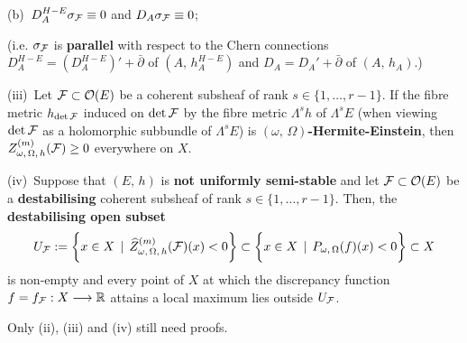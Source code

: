 \documentclass[12pt]{article}
\begin{document}
\begin{Cor}
\vspace{1ex}  

\hspace{2ex} (b)\, $D^{H-E}_A\sigma_{{\cal F}}\equiv 0$ \hspace{3ex} and \hspace{3ex} $D_A\sigma_{{\cal F}}\equiv 0$;

\vspace{1ex}

\noindent (i.e. $\sigma_{{\cal F}}$ is {\bf parallel} with respect to the Chern connections $D^{H-E}_A = (D^{H-E}_A)' + \bar\partial$ of $(A,\,h_A^{H-E})$ and $D_A = D_A' + \bar\partial$ of $(A,\,h_A)$.)

\vspace{1ex}  

(iii)\, Let ${\cal F}\subset{\cal O}(E)$ be a coherent subsheaf of rank $s\in\{1,\dots , r-1\}$. If the fibre metric $h_{\det{\cal F}}$ induced on $\det{\cal F}$ by the fibre metric $\Lambda^sh$ of $\Lambda^sE$ (when viewing $\det{\cal F}$ as a holomorphic subbundle of $\Lambda^sE$) is {\bf $(\omega,\,\Omega)$-Hermite-Einstein}, then  $Z_{\omega,\,\Omega,\,h}^{(m)}({\cal F})\geq 0$ everywhere on $X$.

\vspace{1ex}  

(iv)\, Suppose that $(E,\,h)$ is {\bf not uniformly semi-stable} and let ${\cal F}\subset{\cal O}(E)$ be a {\bf destabilising} coherent subsheaf of rank $s\in\{1,\dots , r-1\}$. Then, the {\bf destabilising open subset} \begin{eqnarray}\label{eqn:U_F_inclusion}U_{\cal F}:=\bigg\{x\in X\,\mid\, \widehat{Z}_{\omega,\,\Omega,\,h}^{(m)}({\cal F})(x)<0\bigg\}\subset\bigg\{x\in X\,\mid\, P_{\omega,\,\Omega}(f)(x)<0\bigg\} \subset X\end{eqnarray} is non-empty and every point of $X$ at which the discrepancy function $f = f_{\cal F}:X\longrightarrow\mathbb{R}$ attains a local maximum lies outside $U_{\cal F}$. 


\end{Cor}   

 Only (ii), (iii) and (iv) still need proofs.
\end{document}
